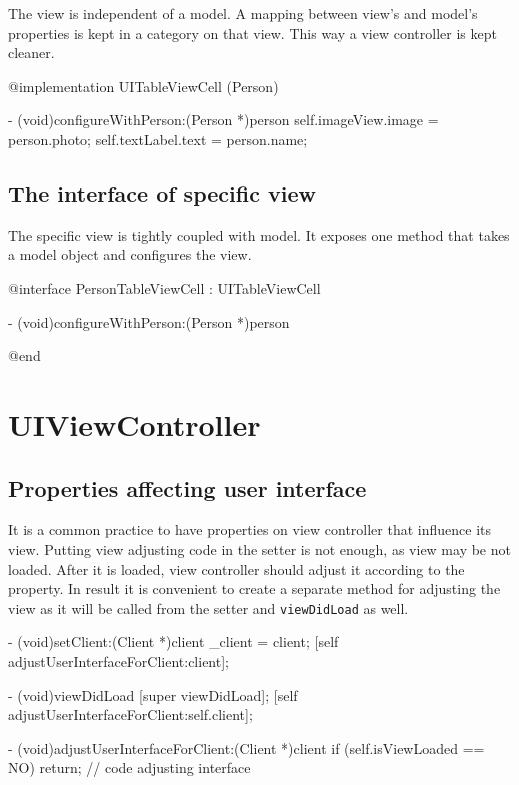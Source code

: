 \documentclass[10pt]{extarticle}
\newcommand{\inlinecode}[1]{{\textcolor{TundoraColor}{\texttt{#1}}}}
\begin{document}
The view is independent of a model. A mapping between view's and model's properties is kept in a category on that view. This way a view controller is kept cleaner.

\begin{codelisting}
@implementation UITableViewCell (Person)

- (void)configureWithPerson:(Person *)person
{
    self.imageView.image = person.photo;
    self.textLabel.text = person.name;
}
\end{codelisting}


\subsection{The interface of specific view}

The specific view is tightly coupled with model. It exposes one method that takes a model object and configures the view.

\begin{codelisting}
@interface PersonTableViewCell : UITableViewCell

- (void)configureWithPerson:(Person *)person

@end
\end{codelisting}


\section{UIViewController}

\subsection{Properties affecting user interface}

It is a common practice to have properties on view controller that influence its view. Putting view adjusting code in the setter is not enough, as view may be not loaded. After it is loaded, view controller should adjust it according to the property. In result it is convenient to create a separate method for adjusting the view as it will be called from the setter and \inlinecode{viewDidLoad} as well.

\begin{codelisting}
- (void)setClient:(Client *)client
{
    _client = client;
    [self adjustUserInterfaceForClient:client];
}

- (void)viewDidLoad
{
    [super viewDidLoad];
    [self adjustUserInterfaceForClient:self.client];
}

- (void)adjustUserInterfaceForClient:(Client *)client
{
    if (self.isViewLoaded == NO) return;
    // code adjusting interface
}
\end{codelisting}
\end{document}
